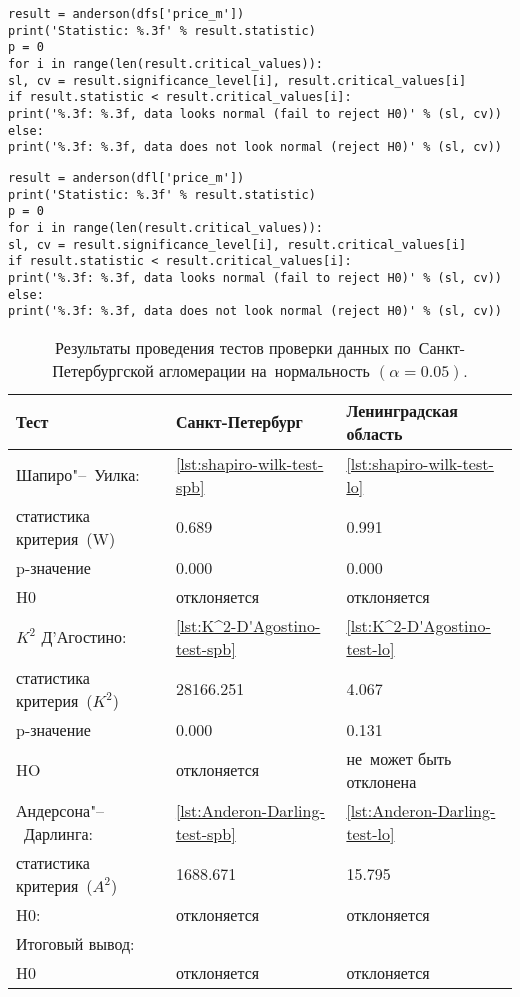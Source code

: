 \documentclass[]{scrreprt}
\begin{document}
%
\begin{lstlisting}[float, caption = Тест Андерсона-Дарлинга для~данных по~Санкт-Петербургу, firstnumber=1, label= lst:Anderon-Darling-test-spb]
result = anderson(dfs['price_m'])
print('Statistic: %.3f' % result.statistic)
p = 0
for i in range(len(result.critical_values)):
sl, cv = result.significance_level[i], result.critical_values[i]
if result.statistic < result.critical_values[i]:
print('%.3f: %.3f, data looks normal (fail to reject H0)' % (sl, cv))
else:
print('%.3f: %.3f, data does not look normal (reject H0)' % (sl, cv))
\end{lstlisting}
%
\begin{lstlisting}[float, caption = Тест Андерсона-Дарлинга для~данных по~Ленинградской области, firstnumber=1, label= lst:Anderon-Darling-test-lo]
result = anderson(dfl['price_m'])
print('Statistic: %.3f' % result.statistic)
p = 0
for i in range(len(result.critical_values)):
sl, cv = result.significance_level[i], result.critical_values[i]
if result.statistic < result.critical_values[i]:
print('%.3f: %.3f, data looks normal (fail to reject H0)' % (sl, cv))
else:
print('%.3f: %.3f, data does not look normal (reject H0)' % (sl, cv))
\end{lstlisting}  
%
\begin{table}[ht]
	\caption{Результаты проведения тестов проверки данных по~Санкт-Петербургской агломерации на~нормальность $({\textstyle \alpha=0.05})$.}\label{tab:normality-tests-values}
	\centering
	\begin{tabular}{lll}
		\hline
		Тест&Санкт-Петербург&Ленинградская область\\
		\hline
		Шапиро"--~Уилка:&\ref{lst:shapiro-wilk-test-spb}&\ref{lst:shapiro-wilk-test-lo}\\
		статистика критерия~(W)&0.689&0.991\\
		p-значение&0.000&0.000\\
		H0&отклоняется&отклоняется\\
		\hline
		${\textstyle K^{2}}$ Д'Агостино:&\ref{lst:K^2-D'Agostino-test-spb}&\ref{lst:K^2-D'Agostino-test-lo}\\
		статистика критерия~(${\textstyle K^{2}}$)&28166.251&4.067\\
		p-значение&0.000&0.131\\
		HO&отклоняется&не~может быть отклонена\\
		\hline
		Андерсона"--~Дарлинга:&\ref{lst:Anderon-Darling-test-spb}&\ref{lst:Anderon-Darling-test-lo}\\
		статистика критерия~(${\textstyle A^{2}}$)&1688.671&15.795\\
		H0:&отклоняется&отклоняется\\
		\hline
		Итоговый вывод:&&\\
		H0&отклоняется&отклоняется\\
		\hline
	\end{tabular}
\end{table}
\end{document}
